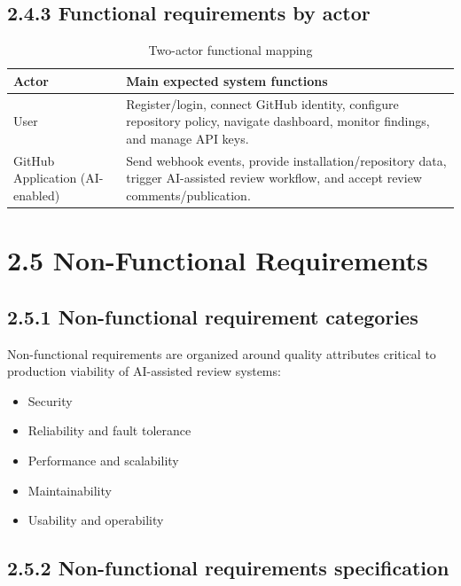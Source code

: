 \subsection{2.4.3 Functional requirements by actor}

\begin{table}[htbp]
\centering
\caption{Two-actor functional mapping}
\label{tab:actor_functional_mapping}
\begin{tabular}{p{}p{}}
\toprule
\textbf{Actor} & \textbf{Main expected system functions} \\
\midrule
User & Register/login, connect GitHub identity, configure repository policy, navigate dashboard, monitor findings, and manage API keys. \\
GitHub Application (AI-enabled) & Send webhook events, provide installation/repository data, trigger AI-assisted review workflow, and accept review comments/publication. \\
\bottomrule
\end{tabular}
\end{table}

\section{2.5 Non-Functional Requirements}

\subsection{2.5.1 Non-functional requirement categories}

Non-functional requirements are organized around quality attributes critical to production viability of AI-assisted review systems:
\begin{itemize}
    \item Security
    \item Reliability and fault tolerance
    \item Performance and scalability
    \item Maintainability
    \item Usability and operability
\end{itemize}

\subsection{2.5.2 Non-functional requirements specification}

